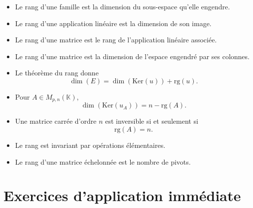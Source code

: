 \documentclass[11pt,a4paper]{article}
\theoremstyle{remark}
\newcommand{\K}{\mathbb{K}}
\newcommand{\Ker}{\mathrm{Ker}}
\newcommand{\rg}{\mathrm{rg}}
\begin{document}
\begin{itemize}
    \item Le rang d’une famille est la dimension du sous-espace qu’elle engendre.
    \item Le rang d’une application linéaire est la dimension de son image.
    \item Le rang d’une matrice est le rang de l’application linéaire associée.
    \item Le rang d’une matrice est la dimension de l’espace engendré par ses colonnes.
    \item Le théorème du rang donne
    \[
    \dim(E)=\dim(\Ker(u))+\rg(u).
    \]
    \item Pour \(A\in M_{p,n}(\K)\),
    \[
    \dim(\Ker(u_A))=n-\rg(A).
    \]
    \item Une matrice carrée d’ordre \(n\) est inversible si et seulement si
    \[
    \rg(A)=n.
    \]
    \item Le rang est invariant par opérations élémentaires.
    \item Le rang d’une matrice échelonnée est le nombre de pivots.
\end{itemize}

\section*{Exercices d’application immédiate}
\end{document}
